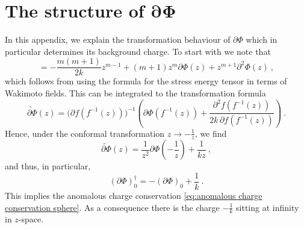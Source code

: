 \documentclass[12pt,a4paper]{article}
\newcommand{\be}{\begin{equation}}
\newcommand{\ee}{\end{equation}}
\begin{document}
\section{The structure of \texorpdfstring{$\boldsymbol{\partial \Phi}$}{dPhi}}\label{app:anomalous partialPhi}

In this appendix, we explain the transformation behaviour of $\partial \Phi$ which in particular determines its background charge. To start with we note that 
\be 
[L_m,\partial \Phi(z)]=-\frac{m(m+1)}{2k}z^{m-1}+(m+1)z^m\partial \Phi(z)+z^{m+1}\partial^2\Phi(z)\ ,
\ee
which follows from using the formula for the stress energy tensor in terms of Wakimoto fields. This can be integrated to the transformation formula
\be 
\widetilde{\partial\Phi}(z)=\big(\partial f(f^{-1}(z))\big)^{-1}\left(\partial \Phi(f^{-1}(z))+\frac{\partial^2f(f^{-1}(z))}{2k\,\partial f(f^{-1}(z))}\right)\ .
\ee
Hence, under the conformal transformation $z \to -\tfrac{1}{z}$, we find
\be 
\widetilde{\partial \Phi}(z)=\frac{1}{z^2}\partial \Phi\left(-\frac{1}{z}\right)+\frac{1}{k z} \ , 
\ee
and thus, in particular,
\be 
(\partial \Phi)_0^\dag=-(\partial \Phi)_0+\frac{1}{k}\ .
\ee
This implies the anomalous charge conservation \eqref{eq:anomalous charge conservation sphere}. As a consequence there is the charge $-\tfrac{1}{k}$ sitting at infinity in $z$-space.
\smallskip
\end{document}
